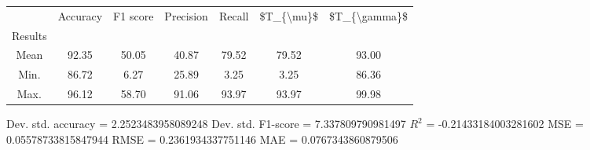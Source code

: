\begin{tabular}{|c|c|c|c|c|c|c|}
\toprule
{} &  Accuracy &  F1 score &  Precision &  Recall &  \$T\_\{\textbackslash mu\}\$ &  \$T\_\{\textbackslash gamma\}\$ \\
Results &           &           &            &         &            &               \\
\hline
Mean    &     92.35 &     50.05 &      40.87 &   79.52 &      79.52 &         93.00 \\
Min.    &     86.72 &      6.27 &      25.89 &    3.25 &       3.25 &         86.36 \\
Max.    &     96.12 &     58.70 &      91.06 &   93.97 &      93.97 &         99.98 \\
\bottomrule
\end{tabular}

 Dev. std. accuracy = 2.2523483958089248
 Dev. std. F1-score = 7.337809790981497
 $R^2$ = -0.21433184003281602
 MSE = 0.05578733815847944
 RMSE = 0.2361934337751146
 MAE = 0.0767343860879506